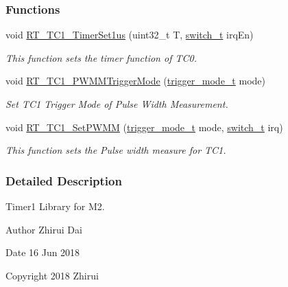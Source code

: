 \subsubsection*{Functions}
\begin{DoxyCompactItemize}
\item 
void \mbox{\hyperlink{a00044_a88f5b0594e9e1006860ebde0dc13c148}{R\+T\+\_\+\+T\+C1\+\_\+\+Timer\+Set1us}} (uint32\+\_\+t T, \mbox{\hyperlink{a00020_ab43e533f3793920486fb81c580f71564}{switch\+\_\+t}} irq\+En)
\begin{DoxyCompactList}\small\item\em This function sets the timer function of T\+C0. \end{DoxyCompactList}\item 
void \mbox{\hyperlink{a00044_afd59a0331a55d7e264c4848e3ddbe72f}{R\+T\+\_\+\+T\+C1\+\_\+\+P\+W\+M\+M\+Trigger\+Mode}} (\mbox{\hyperlink{a00020_a6d33f21be3f0c5cf91c5d638e8aca086}{trigger\+\_\+mode\+\_\+t}} mode)
\begin{DoxyCompactList}\small\item\em Set T\+C1 Trigger Mode of Pulse Width Measurement. \end{DoxyCompactList}\item 
void \mbox{\hyperlink{a00044_a2a6a9244dcaf4b6bf36ac604fce52dbf}{R\+T\+\_\+\+T\+C1\+\_\+\+Set\+P\+W\+MM}} (\mbox{\hyperlink{a00020_a6d33f21be3f0c5cf91c5d638e8aca086}{trigger\+\_\+mode\+\_\+t}} mode, \mbox{\hyperlink{a00020_ab43e533f3793920486fb81c580f71564}{switch\+\_\+t}} irq)
\begin{DoxyCompactList}\small\item\em This function sets the Pulse width measure for T\+C1. \end{DoxyCompactList}\end{DoxyCompactItemize}


\subsubsection{Detailed Description}
Timer1 Library for M2. 

\begin{DoxyAuthor}{Author}
Zhirui Dai 
\end{DoxyAuthor}
\begin{DoxyDate}{Date}
16 Jun 2018 
\end{DoxyDate}
\begin{DoxyCopyright}{Copyright}
2018 Zhirui 
\end{DoxyCopyright}


